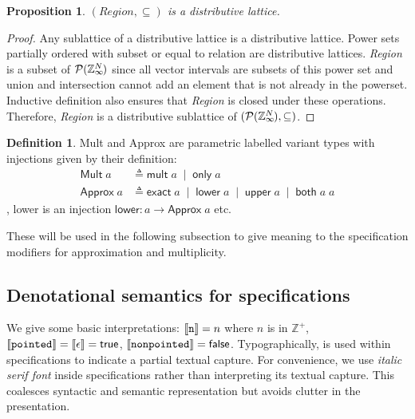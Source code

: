 \documentclass[acmlarge,review]{acmart}
\theoremstyle{definition}
\newtheorem{defn}{Definition}
\theoremstyle{plain}
\newtheorem{prop}{Proposition}
\theoremstyle{remark}
\begin{document}
\begin{prop}{}
  $(\textit{Region},\subseteq)$ is a distributive lattice.
\end{prop}
%
\begin{proof}
  Any sublattice of a distributive lattice is a distributive lattice. Power sets
  partially ordered with subset or equal to relation are distributive lattices.
  \textit{Region} is a subset of $\mathcal{P}{(\textnormal{$\mathbb{Z}_\infty$}{}^{\mkern-19mu{N}})}$ since
  all vector intervals are subsets of this power set and union and intersection
  cannot add an element that is not already in the powerset. Inductive
  definition also ensures that \textit{Region} is closed under these operations.
  Therefore, \textit{Region} is a distributive sublattice of
  $(\mathcal{P}{(\textnormal{$\mathbb{Z}_\infty$}{}^{\mkern-19mu{N}})}, \subseteq)$.
\end{proof}

\begin{defn}{}
  \textsf{Mult} and \textsf{Approx} are parametric labelled variant types with
  injections given by their definition:
%
  \begin{align*}
    \textsf{Mult} \; a &
      \triangleq \textsf{mult} \; a \;\mid\; \textsf{only} \; a \\
    \textsf{Approx} \; a &
      \triangleq \textsf{exact} \; a \;\mid\; \textsf{lower} \; a \;\mid\;
        \textsf{upper} \; a \;\mid\; \textsf{both} \; a \; a
  \end{align*}
%
  \eg{}, \textsf{lower} is an injection $\mathsf{lower} : a \to \mathsf{Approx}
  \; a$ etc.

  These will be used in the following subsection to give meaning to the
  specification modifiers for approximation and multiplicity.
\end{defn}

\subsection{Denotational semantics for specifications}

We give some basic interpretations: $\llbracket{} {\texttt{n}} \rrbracket{} = n$ where $n$ is in
$\mathbb{Z}^+$, $\llbracket{} {\texttt{pointed}} \rrbracket{} = \llbracket \epsilon \rrbracket =
\textsf{true}$, $\llbracket{} {\texttt{nonpointed}} \rrbracket{} = \textsf{false}$.
Typographically,  is used within specifications
to indicate a partial textual capture. For convenience, we use \textit{italic
serif font} inside specifications rather than interpreting its textual capture.
This coalesces syntactic and semantic representation but avoids clutter in the
presentation.
\end{document}
